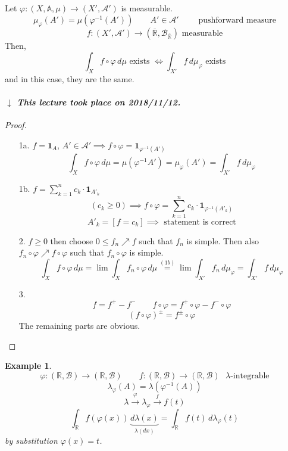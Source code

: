 \documentclass[a4paper]{article}
\newcounter{lecref}[section]
\numberwithin{lecref}{section}
\theoremstyle{break}
\newtheorem{example}[lecref]{Example}
\newcommand{\dateref}[1]{%
  \begin{mdframed}[backgroundcolor=gray!10,innerbottommargin=0pt,innertopmargin=0pt]
    \paragraph{\textit{$\downarrow$ This lecture took place on #1.}}%
  \end{mdframed}%
}
\begin{document}
\begin{theorem}
  Let $\varphi: (X, \mathbb A, \mu) \to (X', \mathcal A')$ is measurable.
  \[ \mu_{\varphi}(A') = \mu(\varphi^{-1}(A')) \qquad A' \in \mathcal A' \qquad \text{ pushforward measure} \]
  \[ f: (X', \mathcal A') \to (\overline{\mathbb R}, \mathcal B_{\overline{\mathbb R}}) \text{ measurable} \]
  Then,
  \[ \int_{X} f \circ \varphi \, d\mu \text{ exists } \iff \int_{X'} f \, d\mu_{\varphi} \text{ exists} \]
  and in this case, they are the same.
\end{theorem}

\dateref{2018/11/12}

\begin{proof}
  \begin{enumerate}
    \item[1a.] $f = \mathbf{1}_A$, $A' \in \mathcal A' \implies f \circ \varphi = \mathbf{1}_{\varphi^{-1}(A')}$
      \[ \int_{X} f\circ \varphi \, d\mu = \mu(\varphi^{-1} A') = \mu_{\varphi}(A') = \int_{X'} f \, d\mu_{\varphi} \]
    \item[1b.] $f = \sum_{k=1}^n c_k \cdot \mathbf{1}_{A'_k}$
      \[ (c_k \geq 0) \implies f \circ \varphi = \sum_{k=1}^n c_k \cdot \mathbf{1}_{\varphi^{-1}(A'_k)} \]
      \[ A'_k = [f = c_k] \implies \text{ statement is correct} \]
    \item[2.]
      $f \geq 0$ then choose $0 \leq f_n \nearrow f$ such that $f_n$ is simple.
      Then also $f_n \circ \varphi \nearrow f \circ \varphi$ such that $f_n \circ \varphi$ is simple.
      \[ \int_X f \circ \varphi \, d\mu = \lim \int_X f_n \circ \varphi \, d\mu \overset{(1b)}{=} \lim \int_{X'} f_n \, d\mu_{\varphi} = \int_{X'} f \, d\mu_{\varphi} \]
    \item[3.]
      \[ f = f^+ - f^- \qquad f \circ \varphi = f^+ \circ \varphi - f^- \circ \varphi \]
      \[ (f \circ \varphi)^{\pm} = f^{\pm} \circ \varphi \]
      The remaining parts are obvious.
  \end{enumerate}
\end{proof}

\begin{example}
  \[ \varphi: (\mathbb R, \mathcal B) \to (\mathbb R, \mathcal B) \qquad f: (\mathbb R, \mathcal B) \to (\mathbb R, \mathcal B) \text{ $\lambda$-integrable} \]
  \[ \lambda_{\varphi}(A) = \lambda(\varphi^{-1}(A)) \]
  \[ \lambda \xrightarrow{\varphi} \lambda_\varphi \xrightarrow{f} f(t) \]
  \[ \int_{\mathbb R} f(\varphi(x)) \, \underbrace{d\lambda(x)}_{\lambda(dx)} = \int_{\mathbb R} f(t) \, d\lambda_{\varphi}(t) \]
  by substitution $\varphi(x) = t$.
\end{example}
\end{document}
